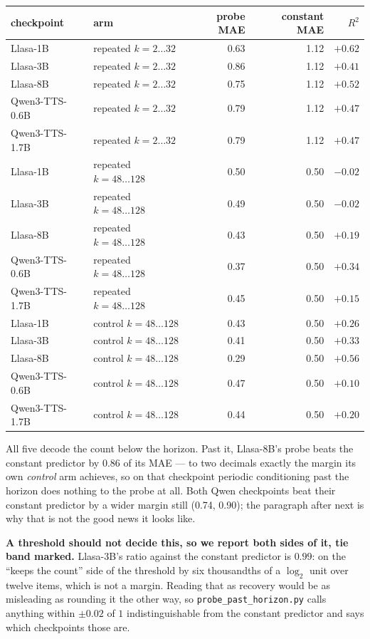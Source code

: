 \documentclass[11pt]{article}
\begin{document}
\begin{center}
\begin{tabular}{llrrr}
\toprule
checkpoint & arm & probe MAE & constant MAE & $R^2$ \\
\midrule
Llasa-1B       & repeated $k=2\ldots32$    & 0.63 & 1.12 & $+0.62$ \\
Llasa-3B       & repeated $k=2\ldots32$    & 0.86 & 1.12 & $+0.41$ \\
Llasa-8B       & repeated $k=2\ldots32$    & 0.75 & 1.12 & $+0.52$ \\
Qwen3-TTS-0.6B & repeated $k=2\ldots32$    & 0.79 & 1.12 & $+0.47$ \\
Qwen3-TTS-1.7B & repeated $k=2\ldots32$    & 0.79 & 1.12 & $+0.47$ \\
\midrule
Llasa-1B       & repeated $k=48\ldots128$  & 0.50 & 0.50 & $-0.02$ \\
Llasa-3B       & repeated $k=48\ldots128$  & 0.49 & 0.50 & $-0.02$ \\
Llasa-8B       & repeated $k=48\ldots128$  & 0.43 & 0.50 & $+0.19$ \\
Qwen3-TTS-0.6B & repeated $k=48\ldots128$  & 0.37 & 0.50 & $+0.34$ \\
Qwen3-TTS-1.7B & repeated $k=48\ldots128$  & 0.45 & 0.50 & $+0.15$ \\
\midrule
Llasa-1B       & control $k=48\ldots128$   & 0.43 & 0.50 & $+0.26$ \\
Llasa-3B       & control $k=48\ldots128$   & 0.41 & 0.50 & $+0.33$ \\
Llasa-8B       & control $k=48\ldots128$   & 0.29 & 0.50 & $+0.56$ \\
Qwen3-TTS-0.6B & control $k=48\ldots128$   & 0.47 & 0.50 & $+0.10$ \\
Qwen3-TTS-1.7B & control $k=48\ldots128$   & 0.44 & 0.50 & $+0.20$ \\
\bottomrule
\end{tabular}
\end{center}

\noindent All five decode the count below the horizon. Past it, Llasa-8B's probe
beats the constant predictor by 0.86 of its MAE --- to two decimals exactly the
margin its own \emph{control} arm achieves, so on that checkpoint periodic
conditioning past the horizon does nothing to the probe at all. Both Qwen
checkpoints beat their constant predictor by a wider margin still (0.74, 0.90);
the paragraph after next is why that is not the good news it looks like.

\noindent\textbf{A threshold should not decide this, so we report both sides of
it, tie band marked.} Llasa-3B's ratio against the constant predictor is $0.99$:
on the ``keeps the count'' side of the threshold by six thousandths of a
$\log_2$ unit over twelve items, which is not a margin. Reading that as recovery
would be as misleading as rounding it the other way, so
\texttt{probe\_past\_horizon.py} calls anything within $\pm0.02$ of $1$
indistinguishable from the constant predictor and says which checkpoints those
are.
\end{document}
